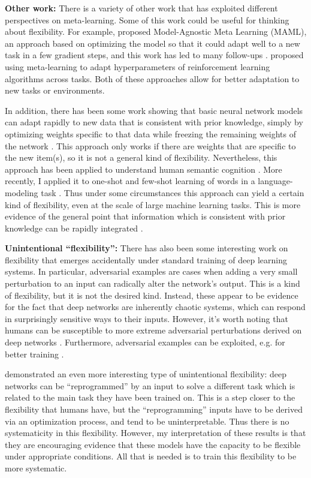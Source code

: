 \documentclass[11pt]{article}
\begin{document}
\textbf{Other work:} There is a variety of other work that has exploited different perspectives on meta-learning. Some of this work could be useful for thinking about flexibility. For example, \citet{Finn2017a} proposed Model-Agnostic Meta Learning (MAML), an approach based on optimizing the model so that it could adapt well to a new task in a few gradient steps, and this work has led to many follow-ups \citep[e.g.]{Finn2017, Finn2018}. \citet{Xu2018} proposed using meta-learning to adapt hyperparameters of reinforcement learning algorithms across tasks. Both of these approaches allow for better adaptation to new tasks or environments. \par
In addition, there has been some work showing that basic neural network models can adapt rapidly to new data that is consistent with prior knowledge, simply by optimizing weights specific to that data while freezing the remaining weights of the network \citep{Rumelhart1993}. This approach only works if there are weights that are specific to the new item(s), so it is not a general kind of flexibility. Nevertheless, this approach has been applied to understand human semantic cognition \citep{Rogers2004}. More recently, I applied it to one-shot and few-shot learning of words in a language-modeling task \citep{Lampinen2018a}. Thus under some circumstances this approach can yield a certain kind of flexibility, even at the scale of large machine learning tasks. This is more evidence of the general point that information which is consistent with prior knowledge can be rapidly integrated \citep{McClelland2013}. \par 
\textbf{Unintentional ``flexibility'':} There has also been some interesting work on flexibility that emerges accidentally under standard training of deep learning systems. In particular, adversarial examples \citep{SzegedyAdv} are cases when adding a very small perturbation to an input can radically alter the network's output. This is a kind of flexibility, but it is not the desired kind. Instead, these appear to be evidence for the fact that deep networks are inherently chaotic systems, which can respond in surprisingly sensitive ways to their inputs. However, it's worth noting that humans can be susceptible to more extreme adversarial perturbations derived on deep networks \citep{Elsayed2018}. Furthermore, adversarial examples can be exploited, e.g. for better training \citep{Goodfellow2015}. \par 
\citet{Elsayed} demonstrated an even more interesting type of unintentional flexibility: deep networks can be ``reprogrammed'' by an input to solve a different task which is related to the main task they have been trained on. This is a step closer to the flexibility that humans have, but the ``reprogramming'' inputs have to be derived via an optimization process, and tend to be uninterpretable. Thus there is no systematicity in this flexibility. However, my interpretation of these results is that they are encouraging evidence that these models have the capacity to be flexible under appropriate conditions. All that is needed is to train this flexibility to be more systematic. \par  
\end{document}
